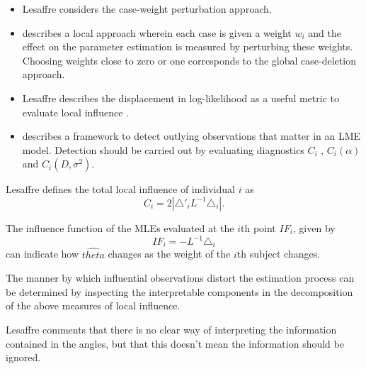 \documentclass[Main.tex]{subfiles}
\begin{document}
\begin{itemize}
\item Lesaffre considers the case-weight perturbation approach.




\item \citep{cook86} describes a local approach wherein each case is given a weight $w_{i}$ and the effect on the parameter estimation is measured by perturbing these weights. Choosing weights close to zero or one corresponds to the global case-deletion approach.


\item Lesaffre  describes the displacement in log-likelihood as a useful metric to evaluate local influence \citep{cook86}.




\item \citet{lesaffre} describes a framework to detect outlying observations that matter in an LME model. Detection should be carried out by evaluating diagnostics $C_{i}$ , $C_{i}(\alpha)$ and $C_{i}(D,\sigma^2)$.
\end{itemize}






Lesaffre defines the total local influence of individual $i$ as
\begin{equation}
C_{i} = 2 | \triangle \prime _{i} L^{-1} \triangle_{i}|.
\end{equation}




The influence function of the MLEs evaluated at the $i$th point $IF_{i}$, given by
\begin{equation}
IF_{i} = -L^{-1}\triangle _{i}
\end{equation}
can indicate how $\hat{theta}$ changes as the weight of the $i$th
subject changes.


The manner by which influential observations distort the estimation process can be determined by inspecting the
interpretable components in the decomposition of the above measures of local influence.




Lesaffre comments that there is no clear way of interpreting the information contained in the angles, but that this doesn't mean the information should be ignored.





\end{document}
